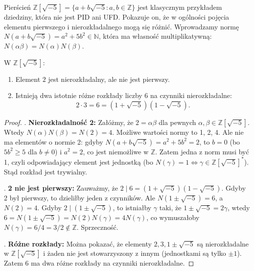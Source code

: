 \begin{intuition}
Pierścień $\mathbb{Z}[\sqrt{-5}] = \{a + b\sqrt{-5} : a,b \in \mathbb{Z}\}$ jest klasycznym przykładem dziedziny, która nie jest PID ani UFD. Pokazuje on, że w ogólności pojęcia elementu pierwszego i nierozkładalnego mogą się różnić. Wprowadzamy normę $N(a+b\sqrt{-5}) = a^2 + 5b^2 \in \mathbb{N}$, która ma własność multiplikatywną: $N(\alpha\beta) = N(\alpha)N(\beta)$.
\end{intuition}

\begin{fact}
W $\mathbb{Z}[\sqrt{-5}]$:
\begin{enumerate}[label=\arabic*)]
    \item Element $2$ jest nierozkładalny, ale nie jest pierwszy.
    \item Istnieją dwa istotnie różne rozkłady liczby $6$ na czynniki nierozkładalne:
    \[
    2 \cdot 3 = 6 = (1+\sqrt{-5})(1-\sqrt{-5}).
    \]
\end{enumerate}
\end{fact}

\begin{proof}
. \textbf{Nierozkładalność 2:} Załóżmy, że $2 = \alpha \beta$ dla pewnych $\alpha, \beta \in \mathbb{Z}[\sqrt{-5}]$. Wtedy $N(\alpha)N(\beta) = N(2) = 4$. Możliwe wartości normy to 1, 2, 4. Ale nie ma elementów o normie 2: gdyby $N(a+b\sqrt{-5}) = a^2+5b^2 = 2$, to $b=0$ (bo $5b^2 \geq 5$ dla $b \neq 0$) i $a^2=2$, co jest niemożliwe w $\mathbb{Z}$. Zatem jedna z norm musi być 1, czyli odpowiadający element jest jednostką (bo $N(\gamma)=1 \iff \gamma \in \mathbb{Z}[\sqrt{-5}]^*$). Stąd rozkład jest trywialny.

. \textbf{2 nie jest pierwszy:} Zauważmy, że $2 \mid 6 = (1+\sqrt{-5})(1-\sqrt{-5})$. Gdyby 2 był pierwszy, to dzieliłby jeden z czynników. Ale $N(1\pm\sqrt{-5}) = 6$, a $N(2)=4$. Gdyby $2 \mid (1\pm\sqrt{-5})$, to istniałby $\gamma$ taki, że $1\pm\sqrt{-5} = 2\gamma$, wtedy $6 = N(1\pm\sqrt{-5}) = N(2)N(\gamma) = 4N(\gamma)$, co wymuszałoby $N(\gamma) = 6/4 = 3/2 \notin \mathbb{Z}$. Sprzeczność.

. \textbf{Różne rozkłady:} Można pokazać, że elementy $2, 3, 1\pm\sqrt{-5}$ są nierozkładalne w $\mathbb{Z}[\sqrt{-5}]$ i żaden nie jest stowarzyszony z innym (jednostkami są tylko $\pm 1$). Zatem $6$ ma dwa różne rozkłady na czynniki nierozkładalne.
\end{proof}

